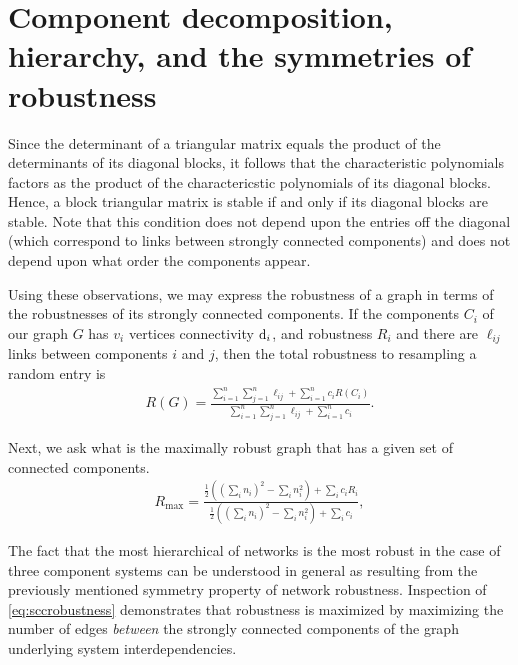 \section{Component decomposition, hierarchy, and the symmetries of robustness}

Since the determinant of a triangular matrix equals the product of the determinants of its diagonal blocks, it follows that the characteristic polynomials factors as the product of the charactericstic polynomials of its diagonal blocks.  Hence, a block triangular matrix is stable if and only if its diagonal blocks are stable.  Note that this condition does not depend upon the entries off the diagonal (which correspond to links between strongly connected components) and does not depend upon what order the components appear.

Using these observations, we may express the robustness of a graph in terms of the robustnesses of its strongly connected components.
If the components $C_i$ of our graph $G$ has $v_i$ vertices connectivity $\mathrm{d}_i$, and robustness $R_i$ and there are $\ell_{ij}$ links between components $i$ and $j$, then the total robustness to resampling a random entry is
\begin{align}
R(G) = \frac{\sum_{i=1}^n \sum_{j=1}^n \ell_{ij} + \sum_{i=1}^n c_i R(C_i)}
            {\sum_{i=1}^n \sum_{j=1}^n \ell_{ij} + \sum_{i=1}^n c_i}. \label{eq:sccrobustness}
\end{align}

Next, we ask what is the maximally robust graph that has a given set of connected components.
\begin{align}
R_{\mathrm{max}} = \frac{\frac{1}{2} ((\sum_i n_i)^2 - \sum_i n_i^2) + \sum_i c_i R_i}{\frac{1}{2} ((\sum_i n_i)^2 - \sum_i n_i^2) + \sum_i c_i}, \label{eq:sccmaxrobustness}
\end{align}

The fact that the most hierarchical of networks is the most robust in the case of three component systems can be understood in general as resulting from the previously mentioned symmetry property of network robustness. Inspection of \ref{eq:sccrobustness} demonstrates that robustness is maximized by maximizing the number of edges \emph{between} the strongly connected components of the graph underlying system interdependencies.

